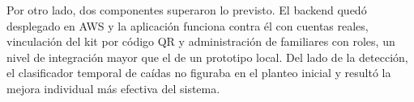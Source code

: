 Por otro lado, dos componentes superaron lo previsto.
El backend quedó desplegado en AWS y la aplicación funciona contra él con cuentas reales, vinculación del kit por código QR y administración de familiares con roles, un nivel de integración mayor que el de un prototipo local.
Del lado de la detección, el clasificador temporal de caídas no figuraba en el planteo inicial y resultó la mejora individual más efectiva del sistema.
